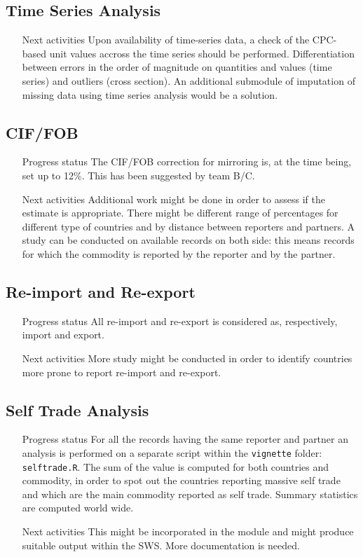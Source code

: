 \documentclass[nojss]{jss}\usepackage[]{graphicx}\usepackage[]{color}
\begin{document}
\subsection{Time Series Analysis}
\begin{itemize}
\item[Next activities] Upon availability of time-series data, a check of the CPC-based unit values accross the time series should be performed. Differentiation between errors in the order of magnitude on quantities and values (time series) and outliers (cross section). An additional submodule of imputation of missing data using time series analysis would be a solution.
\end{itemize}


\subsection{CIF/FOB}
\begin{itemize}
\item[Progress status] The CIF/FOB correction for mirroring is, at the time being, set up to 12\%. This has been suggested by team B/C.
\item[Next activities] Additional work might be done in order to assess if the estimate is appropriate. There might be different range of percentages for different type of countries and by distance between reporters and partners. A study can be conducted on available records on both side: this means records for which the commodity is reported by the reporter and by the partner.
\end{itemize}

\subsection{Re-import and Re-export}
\begin{itemize}
\item[Progress status] All re-import and re-export is considered as, respectively, import and export.
\item[Next activities] More study might be conducted in order to identify countries more prone to report re-import and re-export.
\end{itemize}

\subsection{Self Trade Analysis}
\begin{itemize}
\item[Progress status] For all the records having the same reporter and partner an analysis is performed on a separate script within the {\tt vignette} folder: {\tt selftrade.R}. The sum of the value is computed for both countries and commodity, in order to spot out the countries reporting massive self trade and which are the main commodity reported as self trade. Summary statistics are computed world wide.
\item[Next activities] This might be incorporated in the module and might produce suitable output within the SWS. More documentation is needed.
\end{itemize}
\end{document}
